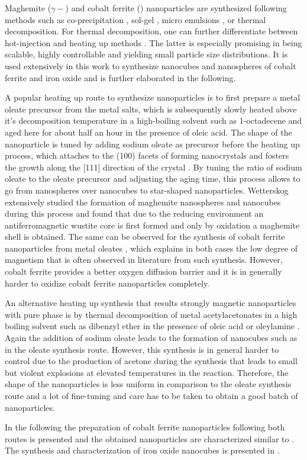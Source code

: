 \documentclass[\main/dresen_thesis.tex]{subfiles}
\begin{document}
  Maghemite ($\gamma-$) and cobalt ferrite () nanoparticles are synthesized following methods such as co-precipitation \cite{Fried_2001_Order}, sol-gel \cite{Niederberger_2009_Metal}, micro emulsions \cite{Pillai_1996_Synth}, or thermal decomposition.
  For thermal decomposition, one can further differentiate between hot-injection \cite{Hyeon_2003_Chemi} and heating up methods \cite{Embden_2015_TheHe}.
  The latter is especially promising in being scalable, highly controllable and yielding small particle size distributions.
  It is used extensively in this work to synthesize nanocubes and nanospheres of cobalt ferrite and iron oxide and is further elaborated in the following.

  A popular heating up route to synthesize nanoparticles is to first prepare a metal oleate precursor from the metal salts, which is subsequently slowly heated above it's decomposition temperature in a high-boiling solvent such as 1-octadecene and aged here for about half an hour in the presence of oleic acid.
  The shape of the nanoparticle is tuned by adding sodium oleate as precursor before the heating up process, which attaches to the (100) facets of forming nanocrystals and fosters the growth along the [111] direction of the crystal \cite{Bao_2009_Forma}.
  By tuning the ratio of sodium oleate to the oleate precursor and adjusting the aging time, this process allows to go from nanospheres over nanocubes to star-shaped nanoparticles.
  Wetterskog \etal extensively studied the formation of maghemite nanospheres and nanocubes during this process \cite{Wetterskog_2014_Preci, Wetterskog_2013_Anoma} and found that due to the reducing environment an antiferromagnetic wustite core is first formed and only by oxidation a maghemite shell is obtained.
  The same can be observed for the synthesis of cobalt ferrite nanoparticles from metal oleates \cite{Bodnarchuk_2009_Excha}, which explains in both cases the low degree of magnetism that is often observed in literature from such synthesis.
  However, cobalt ferrite provides a better oxygen diffusion barrier \cite{Chen_2015_Synth} and it is in generally harder to oxidize cobalt ferrite nanoparticles completely.

  An alternative heating up synthesis that results strongly magnetic nanoparticles with pure phase is by thermal decomposition of metal acetylacetonates in a high boiling solvent such as dibenzyl ether in the presence of oleic acid or oleylamine \cite{Sun_2002_SizeC, Wu_2014_Monol}.
  Again the addition of sodium oleate leads to the formation of nanocubes such as in the oleate synthesis route.
  However, this synthesis is in general harder to control due to the production of acetone during the synthesis that leads to small but violent explosions at elevated temperatures in the reaction.
  Therefore, the shape of the nanoparticles is less uniform in comparison to the oleate synthesis route and a lot of fine-tuning and care has to be taken to obtain a good batch of nanoparticles.

  In the following the preparation of cobalt ferrite nanoparticles following both routes is presented and the obtained nanoparticles are characterized similar to . The synthesis and characterization of iron oxide nanocubes is presented in .
\end{document}
